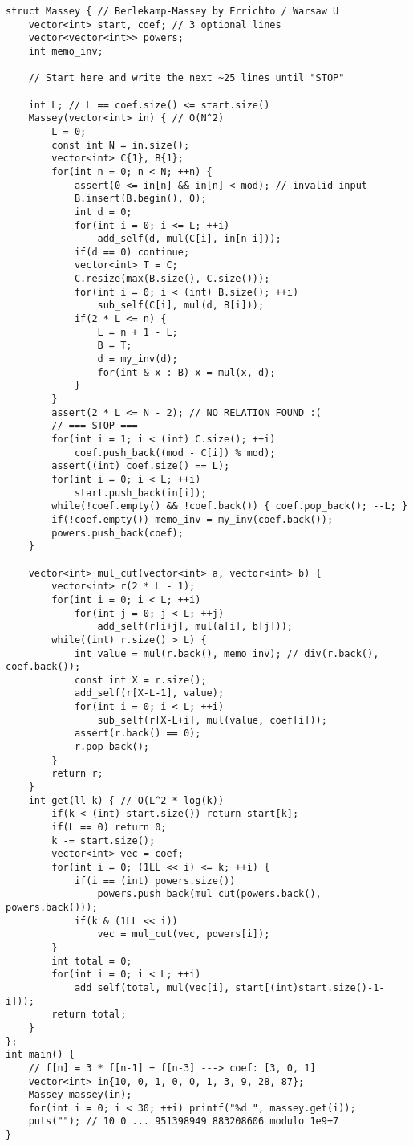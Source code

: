 \documentclass[landscape, 8pt, a4paper, oneside]{extarticle}
\begin{document}
\begin{multicols}{3}
\begin{verbatim}
struct Massey { // Berlekamp-Massey by Errichto / Warsaw U
    vector<int> start, coef; // 3 optional lines
    vector<vector<int>> powers;
    int memo_inv;
    
    // Start here and write the next ~25 lines until "STOP"
    
    int L; // L == coef.size() <= start.size()
    Massey(vector<int> in) { // O(N^2)
        L = 0;
        const int N = in.size();
        vector<int> C{1}, B{1};
        for(int n = 0; n < N; ++n) {
            assert(0 <= in[n] && in[n] < mod); // invalid input
            B.insert(B.begin(), 0);
            int d = 0;
            for(int i = 0; i <= L; ++i)
                add_self(d, mul(C[i], in[n-i]));
            if(d == 0) continue;
            vector<int> T = C;
            C.resize(max(B.size(), C.size()));
            for(int i = 0; i < (int) B.size(); ++i)
                sub_self(C[i], mul(d, B[i]));
            if(2 * L <= n) {
                L = n + 1 - L;
                B = T;
                d = my_inv(d);
                for(int & x : B) x = mul(x, d);
            }
        }
        assert(2 * L <= N - 2); // NO RELATION FOUND :(
        // === STOP ===
        for(int i = 1; i < (int) C.size(); ++i)
            coef.push_back((mod - C[i]) % mod);
        assert((int) coef.size() == L);
        for(int i = 0; i < L; ++i)
            start.push_back(in[i]);
        while(!coef.empty() && !coef.back()) { coef.pop_back(); --L; }
        if(!coef.empty()) memo_inv = my_inv(coef.back());
        powers.push_back(coef);
    }
    
    vector<int> mul_cut(vector<int> a, vector<int> b) {
        vector<int> r(2 * L - 1);
        for(int i = 0; i < L; ++i)
            for(int j = 0; j < L; ++j)
                add_self(r[i+j], mul(a[i], b[j]));
        while((int) r.size() > L) {
            int value = mul(r.back(), memo_inv); // div(r.back(), coef.back());
            const int X = r.size();
            add_self(r[X-L-1], value);
            for(int i = 0; i < L; ++i)
                sub_self(r[X-L+i], mul(value, coef[i]));
            assert(r.back() == 0);
            r.pop_back();
        }
        return r;
    }
    int get(ll k) { // O(L^2 * log(k))
        if(k < (int) start.size()) return start[k];
        if(L == 0) return 0;
        k -= start.size();
        vector<int> vec = coef;
        for(int i = 0; (1LL << i) <= k; ++i) {
            if(i == (int) powers.size())
                powers.push_back(mul_cut(powers.back(), powers.back()));
            if(k & (1LL << i))
                vec = mul_cut(vec, powers[i]);
        }
        int total = 0;
        for(int i = 0; i < L; ++i)
            add_self(total, mul(vec[i], start[(int)start.size()-1-i]));
        return total;
    }
};
int main() {
    // f[n] = 3 * f[n-1] + f[n-3] ---> coef: [3, 0, 1]
    vector<int> in{10, 0, 1, 0, 0, 1, 3, 9, 28, 87};
    Massey massey(in);
    for(int i = 0; i < 30; ++i) printf("%d ", massey.get(i));
    puts(""); // 10 0 ... 951398949 883208606 modulo 1e9+7
}   
\end{verbatim}

\end{multicols}
\end{document}
